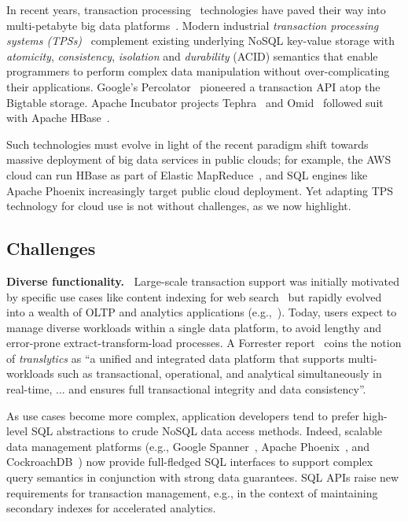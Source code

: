In recent years, transaction processing~\cite{Gray:1992:TPC:573304} technologies have paved their way into multi-petabyte big data platforms~\cite{Percolator2010,Spanner2012,Omid2017}. 
Modern industrial \emph{transaction processing systems (TPSs)}~\cite{Percolator2010, Omid2017, tephra, cockroach} complement 
existing underlying NoSQL key-value storage with {\em atomicity}, {\em consistency}, {\em isolation\/} and {\em durability} (ACID) semantics that enable programmers to perform complex data manipulation without over-complicating their applications. Google's Percolator~\cite{Percolator2010} pioneered a transaction API atop the Bigtable storage. Apache 
Incubator projects Tephra~\cite{tephra} and Omid~\cite{Omid2017} followed suit with Apache HBase~\cite{hbase}. 

Such technologies must  evolve  in  light of the recent paradigm shift towards massive deployment of  
big data services in public clouds; 
for example,  the AWS cloud can run HBase as part of  Elastic MapReduce~\cite{emr}, 
and SQL engines like Apache Phoenix increasingly  target public cloud deployment.
Yet adapting TPS  technology for cloud use is not without challenges, as we now highlight.  

\subsection{Challenges}

{\bf Diverse functionality.\ }
Large-scale transaction support was initially motivated by specific use cases like content indexing for 
web search~\cite{Percolator2010, Omid2017} but  rapidly evolved into a wealth of OLTP and  analytics 
applications (e.g.,~\cite{F1-2013}). Today,  users expect to manage diverse workloads within 
a single data platform, to avoid lengthy and error-prone extract-transform-load processes.
A Forrester report~\cite{Forrester2017} coins the notion of {\em translytics}  as ``a unified and integrated data platform that supports multi-workloads such as transactional, operational, and analytical simultaneously in real-time, ... and ensures full transactional integrity and data consistency''. 

As use cases become more complex, application developers tend to prefer high-level SQL abstractions to 
crude NoSQL data access methods. Indeed, scalable data management platforms (e.g., Google Spanner~\cite{Spanner2012}, Apache Phoenix~\cite{phoenix}, and CockroachDB~\cite{cockroach}) now provide full-fledged SQL interfaces   to support complex query semantics in conjunction with strong data guarantees. SQL APIs raise new requirements for transaction management, e.g., in the context of maintaining secondary indexes for accelerated analytics. 


